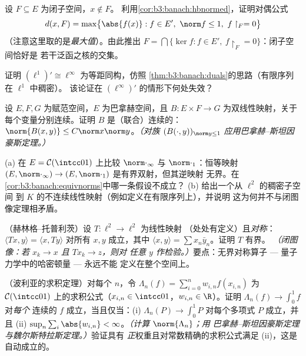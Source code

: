 \begin{exercise}[$\star\star$]\label{exo:b3:banach:4}
设 $F \subseteq E$ 为闭子空间，$x \notin F$。
利用\cref{cor:b3:banach:hbnormed}，证明对偶公式
\[
d(x, F) = \max\bigl\{\abs{f(x)} : f \in E',\ \norm f \leq 1,\
f\restriction_F = 0\bigr\}
\]
（注意这里取的是\emph{最大值}）。由此推出 $F = \bigcap\{\ker f : f
\in E',\ f\restriction_F = 0\}$：闭子空间恰好是
若干泛函之核的交集。
\end{exercise}

\begin{exercise}[$\star\star$]\label{exo:b3:banach:5}
证明 $(\ell^1)' \cong \ell^\infty$ 为等距同构，仿照
\cref{thm:b3:banach:duals}的思路（有限序列
在 $\ell^1$ 中稠密）。
该论证在 $(\ell^\infty)'$ 的情形下何处失效？
\end{exercise}

\begin{exercise}[$\star\star$]\label{exo:b3:banach:6}
设 $E, F, G$ 为赋范空间，$E$ 为巴拿赫空间，且 $B \colon E \times
F \to G$ 为双线性映射，关于每个变量分别连续。证明
$B$ 是（联合）连续的：$\norm{B(x,y)} \leq
C\norm x\norm y$。\emph{（对族
$(B(\cdot, y))_{\norm y \leq 1}$ 应用巴拿赫–斯坦因豪斯定理。）}
\end{exercise}

\begin{exercise}[$\star\star$]\label{exo:b3:banach:7}
(a) 在 $E = \mathcal C(\intcc01)$ 上比较 $\norm\cdot_\infty$
与 $\norm\cdot_1$：恒等映射 $(E, \norm\cdot_\infty) \to
(E, \norm\cdot_1)$ 是有界双射，但其逆映射
无界。在
\cref{cor:b3:banach:equivnorms}中哪一条假设不成立？
(b) 给出一个从 $\ell^2$ 的稠密子空间
到 $K$ 的不连续线性映射（例如定义在有限序列上），并说明
这为何并不与闭图像定理相矛盾。
\end{exercise}

\begin{exercise}[$\star\star\star$]\label{exo:b3:banach:8}
（赫林格–托普利茨）设 $T \colon \ell^2 \to \ell^2$ 为线性映射
（处处有定义）且\emph{对称}：$\langle Tx,
y\rangle = \langle x, Ty\rangle$ 对所有 $x, y$ 成立，其中 $\langle
x, y \rangle = \sum x_n\bar y_n$。证明 $T$ 有界。
\emph{（闭图像：若 $x_k \to x$ 且 $Tx_k \to z$，则对
任意 $y$ 作检验。）}要点：无界对称算子
--- 量子力学中的哈密顿量 --- 永远不能
定义在整个空间上。
\end{exercise}

\begin{exercise}[$\star\star\star$]\label{exo:b3:banach:9}
（波利亚的求积定理）对每个 $n$，令 $\Lambda_n(f)
= \sum_{i=0}^{n} w_{i,n}f(x_{i,n})$ 为
$\mathcal C(\intcc01)$ 上的求积公式（$x_{i,n} \in \intcc01$，$w_{i,n} \in
\R$）。证明 $\Lambda_n(f) \to \int_0^1f$ 对\emph{每个}
连续的 $f$ 成立，当且仅当：(i) $\Lambda_n(P) \to \int_0^1P$
对每个多项式 $P$ 成立，并且 (ii) $\sup_n\sum_i\abs{w_{i,n}} <
\infty$。\emph{（计算 $\norm{\Lambda_n}$；用
巴拿赫–斯坦因豪斯定理与魏尔斯特拉斯定理。）}验证具有
\emph{正}权重且对常数精确的求积公式满足
(ii)，这是自动成立的。
\end{exercise}

